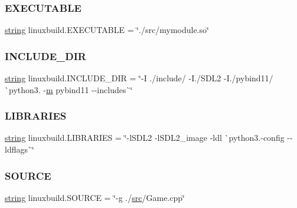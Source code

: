 \mbox{\label{namespacelinuxbuild_ae5a3f16392392771c37d2119f51f2a46}} 
\subsubsection{\texorpdfstring{EXECUTABLE}{EXECUTABLE}}
{\footnotesize\ttfamily \mbox{\hyperlink{asdl_8h_ae84541b4f3d8e1ea24ec0f466a8c568b}{string}} linuxbuild.\+E\+X\+E\+C\+U\+T\+A\+B\+LE = \char`\"{}./src/mymodule.\+so\char`\"{}}

\mbox{\label{namespacelinuxbuild_a5043360151bd876c9aa7bcd6bff4dc5d}} 
\subsubsection{\texorpdfstring{INCLUDE\_DIR}{INCLUDE\_DIR}}
{\footnotesize\ttfamily \mbox{\hyperlink{asdl_8h_ae84541b4f3d8e1ea24ec0f466a8c568b}{string}} linuxbuild.\+I\+N\+C\+L\+U\+D\+E\+\_\+\+D\+IR = \char`\"{}-\/I ./include/ -\/I./S\+D\+L2 -\/I./pybind11/ \`{}python3. -\/\mbox{\hyperlink{_s_d_l__opengl__glext_8h_af593500c283bf1a787a6f947f503a5c2}{m}} pybind11 -\/-\/includes\`{}\char`\"{}}

\mbox{\label{namespacelinuxbuild_a8d8b6325ef25fe198a192c9b2f32a3c4}} 
\subsubsection{\texorpdfstring{LIBRARIES}{LIBRARIES}}
{\footnotesize\ttfamily \mbox{\hyperlink{asdl_8h_ae84541b4f3d8e1ea24ec0f466a8c568b}{string}} linuxbuild.\+L\+I\+B\+R\+A\+R\+I\+ES = \char`\"{}-\/l\+S\+D\+L2 -\/l\+S\+D\+L2\+\_\+image -\/ldl \`{}python3.-\/config -\/-\/ldflags\`{}\char`\"{}}

\mbox{\label{namespacelinuxbuild_a9a51ab9159bdd85160ff7debd98e8bf1}} 
\subsubsection{\texorpdfstring{SOURCE}{SOURCE}}
{\footnotesize\ttfamily \mbox{\hyperlink{asdl_8h_ae84541b4f3d8e1ea24ec0f466a8c568b}{string}} linuxbuild.\+S\+O\+U\+R\+CE = \char`\"{}-\/g ./\mbox{\hyperlink{_s_d_l__opengl__glext_8h_a72e0fdf0f845ded60b1fada9e9195cd7}{src}}/Game.\+cpp\char`\"{}}

